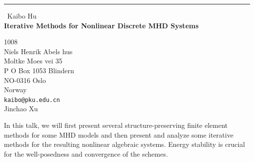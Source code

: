 \documentclass{report}
\begin{document}
\begin{center}
\rule{6in}{1pt} \
{\large Kaibo Hu \\
{\bf Iterative Methods for Nonlinear Discrete MHD Systems}}

1008 \\ Niels Henrik Abels hus \\ Moltke Moes vei 35 \\ P O Box 1053 Blindern \\ NO-0316 Oslo \\ Norway
\\
{\tt kaibo@pku.edu.cn}\\
Jinchao Xu\end{center}

In this talk, we will first present several structure-preserving finite
element methods for some MHD models and then present and analyze some
iterative methods for the resulting nonlinear algebraic systems. Energy
stability is crucial for the well-posedness and convergence of the
schemes.
\end{document}
